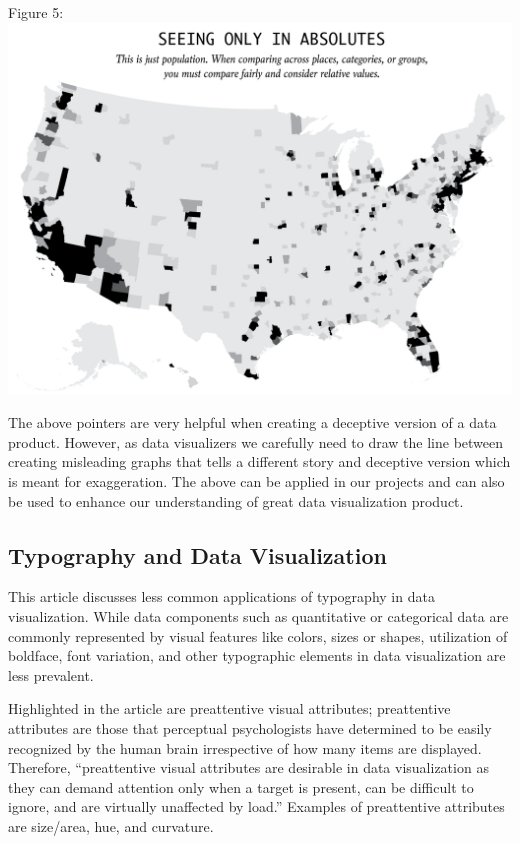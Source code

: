 \documentclass[]{book}
\theoremstyle{definition}
\theoremstyle{definition}
\theoremstyle{definition}
\theoremstyle{remark}
\begin{document}
Figure 5:\\
\includegraphics{images/Maps1.png}

The above pointers are very helpful when creating a deceptive version of
a data product. However, as data visualizers we carefully need to draw
the line between creating misleading graphs that tells a different story
and deceptive version which is meant for exaggeration. The above can be
applied in our projects and can also be used to enhance our
understanding of great data visualization product.

\subsection{Typography and Data
Visualization}\label{typography-and-data-visualization}

This article discusses less common applications of typography in data
visualization. While data components such as quantitative or categorical
data are commonly represented by visual features like colors, sizes or
shapes, utilization of boldface, font variation, and other typographic
elements in data visualization are less prevalent.

Highlighted in the article are preattentive visual attributes;
preattentive attributes are those that perceptual psychologists have
determined to be easily recognized by the human brain irrespective of
how many items are displayed. Therefore, ``preattentive visual
attributes are desirable in data visualization as they can demand
attention only when a target is present, can be difficult to ignore, and
are virtually unaffected by load.'' Examples of preattentive attributes
are size/area, hue, and curvature.
\end{document}
